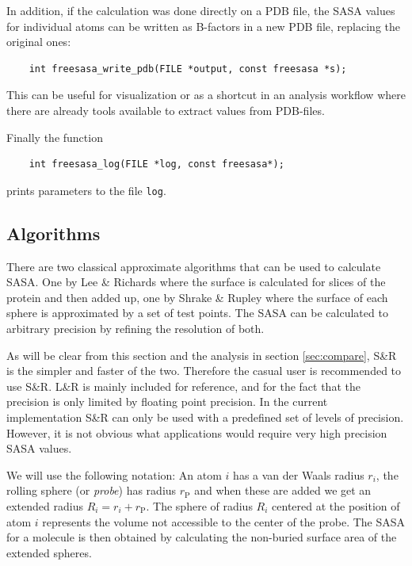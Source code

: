 \documentclass[a4paper,11pt]{article}
\begin{document}
In addition, if the calculation was done directly on a PDB file, the
SASA values for individual atoms can be written as B-factors in a new
PDB file, replacing the original ones:
\begin{verbatim}
    int freesasa_write_pdb(FILE *output, const freesasa *s);
\end{verbatim}
This can be useful for visualization or as a shortcut in an analysis
workflow where there are already tools available to extract values
from PDB-files.

Finally the function
\begin{verbatim}
    int freesasa_log(FILE *log, const freesasa*);
\end{verbatim}
prints parameters to the file \verb|log|.

\appendix

\begin{small}

\section{Algorithms}\label{sec:alg}

There are two classical approximate algorithms that can be used to
calculate SASA. One by Lee \& Richards \cite{LnR} where the surface is
calculated for slices of the protein and then added up, one by Shrake
\& Rupley \cite{SnR} where the surface of each sphere is approximated
by a set of test points. The SASA can be calculated to arbitrary
precision by refining the resolution of both. 

As will be clear from this section and the analysis in section
\ref{sec:compare}, S\&R is the simpler and faster of the
two. Therefore the casual user is recommended to use S\&R. L\&R is
mainly included for reference, and for the fact that the precision is
only limited by floating point precision. In the current
implementation S\&R can only be used with a predefined set of levels
of precision. However, it is not obvious what applications would
require very high precision SASA values.

We will use the following notation: An atom $i$ has a van der Waals
radius $r_i$, the rolling sphere (or \emph{probe}) has radius
$r_\text{P}$ and when these are added we get an extended radius $R_i =
r_i + r_\text{P}$. The sphere of radius $R_i$ centered at the position
of atom $i$ represents the volume not accessible to the center of the
probe. The SASA for a molecule is then obtained by calculating the
non-buried surface area of the extended spheres.


\end{small}
\end{document}
